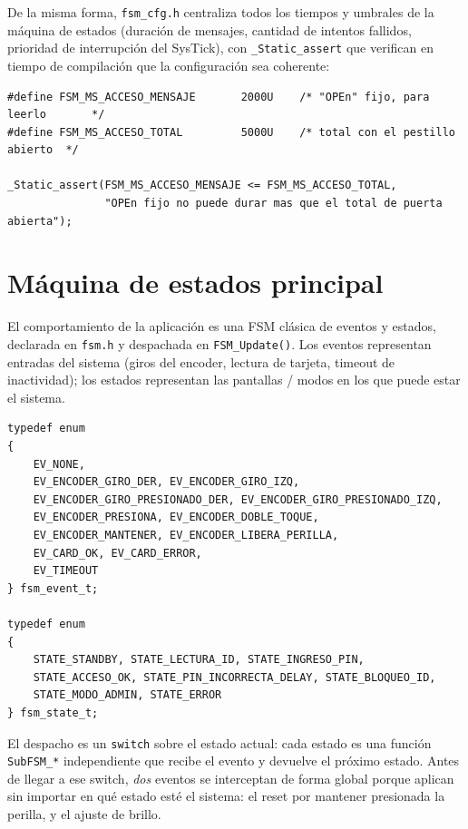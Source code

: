 \documentclass[11pt,a4paper]{article}
\begin{document}
De la misma forma, \lstinline{fsm_cfg.h} centraliza todos los tiempos y
umbrales de la máquina de estados (duración de mensajes, cantidad de
intentos fallidos, prioridad de interrupción del SysTick), con
\lstinline{_Static_assert} que verifican en tiempo de compilación que la
configuración sea coherente:

\begin{lstlisting}[caption={Chequeos de coherencia en tiempo de compilación (\texttt{fsm\_cfg.h}).}, label={lst:staticassert}]
#define FSM_MS_ACCESO_MENSAJE       2000U    /* "OPEn" fijo, para leerlo       */
#define FSM_MS_ACCESO_TOTAL         5000U    /* total con el pestillo abierto  */

_Static_assert(FSM_MS_ACCESO_MENSAJE <= FSM_MS_ACCESO_TOTAL,
               "OPEn fijo no puede durar mas que el total de puerta abierta");
\end{lstlisting}


\section{Máquina de estados principal}

El comportamiento de la aplicación es una FSM clásica de eventos y estados,
declarada en \lstinline{fsm.h} y despachada en \lstinline{FSM_Update()}. Los
eventos representan entradas del sistema (giros del encoder, lectura de
tarjeta, timeout de inactividad); los estados representan las pantallas /
modos en los que puede estar el sistema.

\begin{lstlisting}[caption={Enumeraciones de eventos y estados de la FSM (\texttt{fsm.h}).}, label={lst:fsmenums}]
typedef enum
{
    EV_NONE,
    EV_ENCODER_GIRO_DER, EV_ENCODER_GIRO_IZQ,
    EV_ENCODER_GIRO_PRESIONADO_DER, EV_ENCODER_GIRO_PRESIONADO_IZQ,
    EV_ENCODER_PRESIONA, EV_ENCODER_DOBLE_TOQUE,
    EV_ENCODER_MANTENER, EV_ENCODER_LIBERA_PERILLA,
    EV_CARD_OK, EV_CARD_ERROR,
    EV_TIMEOUT
} fsm_event_t;

typedef enum
{
    STATE_STANDBY, STATE_LECTURA_ID, STATE_INGRESO_PIN,
    STATE_ACCESO_OK, STATE_PIN_INCORRECTA_DELAY, STATE_BLOQUEO_ID,
    STATE_MODO_ADMIN, STATE_ERROR
} fsm_state_t;
\end{lstlisting}

El despacho es un \lstinline{switch} sobre el estado actual: cada estado es
una función \lstinline{SubFSM_*} independiente que recibe el evento y
devuelve el próximo estado. Antes de llegar a ese switch, \emph{dos}
eventos se interceptan de forma global porque aplican sin importar en qué
estado esté el sistema: el reset por mantener presionada la perilla, y el
ajuste de brillo.
\end{document}
